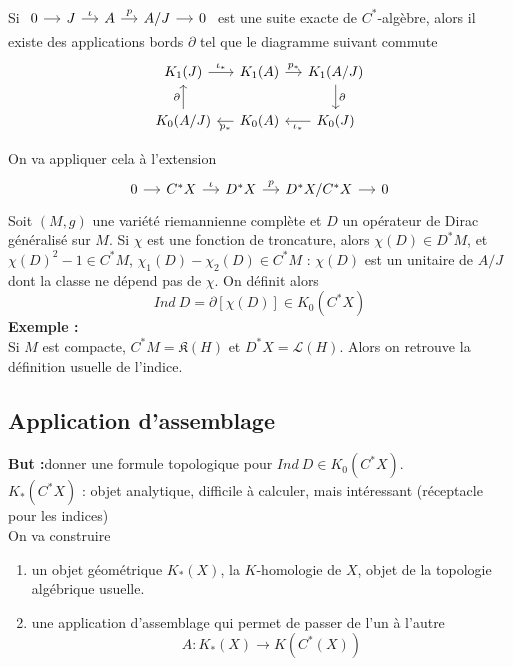 \documentclass{beamer}
\begin{document}
\begin{frame}
\begin{thm}
Si $\begin{tikzcd}[ampersand replacement=\&,column sep = small]
0 \arrow{r} \& J \arrow{r}{\iota} \& A\arrow{r}{p} \& A/J\arrow{r} \& 0  
\end{tikzcd}$ est une suite exacte de $C^*$-algèbre, alors il existe des applications bords $\partial$ tel que le diagramme suivant commute
\[\begin{tikzcd}[ampersand replacement=\&,column sep = small]
 K_1(J)\arrow{r}{\iota_*}\& K_1(A)\arrow{r}{p_*}\& K_1(A/J)\arrow{d}{\partial}\\
K_0(A/J)\arrow{u}{\partial}\& K_0(A)\arrow{l}{p_*}\& K_0(J)\arrow{l}{\iota_*}
\end{tikzcd}\]
\end{thm}
\end{frame}

\begin{frame}
On va appliquer cela à l'extension \[\begin{tikzcd}[ampersand replacement=\&,column sep = small]
0 \arrow{r} \& C^*X \arrow{r}{\iota} \& D^*X\arrow{r}{p} \& D^*X/C^*X\arrow{r} \& 0  
\end{tikzcd}\]
Soit $(M,g)$ une variété riemannienne complète et $D$ un opérateur de Dirac généralisé sur $M$. Si $\chi$ est une fonction de troncature, alors $\chi(D)\in D^*M$, et $\chi(D)^2-1\in C^*M$, $\chi_1(D)-\chi_2(D)\in C^*M$ : $\chi(D)$ est un unitaire de $A/J$ dont la classe ne dépend pas de $\chi$. On définit alors 
\[Ind \ D = \partial [\chi(D)] \in K_0(C^*X)\]
\textbf{Exemple :}\\
Si $M$ est compacte, $C^*M = \mathfrak K(H)$ et $D^*X = \mathcal L(H)$. Alors on retrouve la définition usuelle de l'indice.
\end{frame}

\subsection{Application d'assemblage}
\begin{frame}
\textbf{But :}donner une formule topologique pour $Ind\ D\in K_0(C^*X)$.\\

$K_*(C^*X)$ : objet analytique, difficile à calculer, mais intéressant (réceptacle pour les indices)\\

On va construire 
\begin{enumerate}
\item un objet géométrique $K_*(X)$, la $K$-homologie de $X$, objet de la topologie algébrique usuelle. 
\item une application d'assemblage qui permet de passer de l'un à l'autre
\[A : K_*(X)\rightarrow K(C^*(X))\]
\end{enumerate} 
 
\end{frame}
\end{document}
